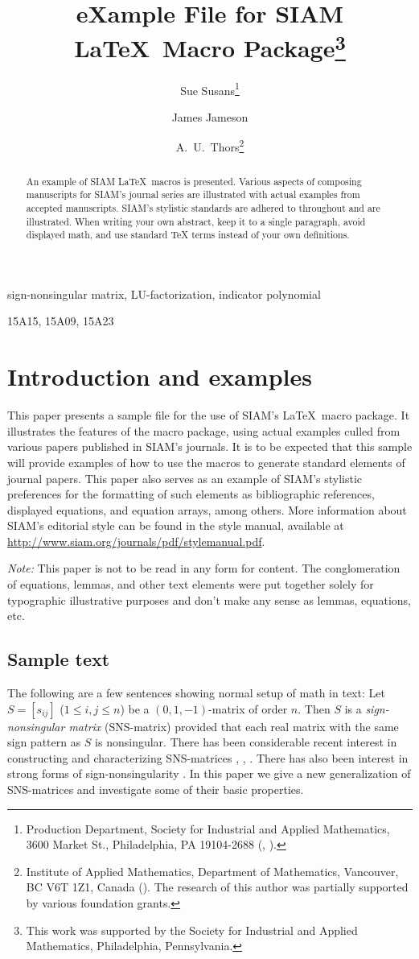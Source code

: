\documentclass[final,leqno,onetabnum]{siamltex0315}
\title{eXample File for SIAM \LaTeX\ Macro Package\thanks{This 
        work was supported by the Society for Industrial and
        Applied Mathematics, Philadelphia, Pennsylvania.}}
\author{Sue Susans\thanks{Production Department, Society
        for Industrial and Applied Mathematics, 3600 Market St., 
        Philadelphia, PA 
        19104-2688 (\email{pseudonym@siam.org}, \email{alias@siam.org}).}
   \and James Jameson\footnotemark[2]
   \and A.~U.~Thors\thanks{Institute of Applied Mathematics, Department of
        Mathematics, Vancouver, BC V6T 1Z1, Canada (\email{au.thors@math.ubc.ca}).
        The research of this author was partially supported by various foundation grants.}}
\begin{document}
\maketitle

\begin{abstract}
An example of SIAM \LaTeX\ macros is presented. Various
aspects of composing manuscripts for SIAM's journal series
are illustrated with actual examples from accepted
manuscripts. SIAM's stylistic standards are adhered to
throughout and are illustrated.  When writing your own abstract, keep it to a single paragraph, avoid 
displayed math, and use standard TeX terms instead of your own definitions. 
\end{abstract}

\begin{keywords} 
sign-nonsingular matrix, LU-factorization, indicator
polynomial 
\end{keywords}

\begin{AMS}
15A15, 15A09, 15A23
\end{AMS}

\pagestyle{myheadings}
\thispagestyle{plain}


\section{Introduction and examples}
This paper presents a sample file for the use of SIAM's
\LaTeX\ macro package. It illustrates the features of the
macro package, using actual examples culled from various
papers published in SIAM's journals. It is to be expected
that this sample will provide examples of how to use the
macros to generate standard elements of journal papers. This paper also
serves as an example of SIAM's stylistic preferences for
the formatting of such elements as bibliographic references,
displayed equations, and equation arrays, among others.  More information
about SIAM's editorial style can be found in the style manual, available
at \url{http://www.siam.org/journals/pdf/stylemanual.pdf}.

{\em Note:} This paper is not to be read in any form for content. 
The conglomeration of equations, lemmas, and other text elements were 
put together solely for typographic illustrative purposes and don't 
make any sense as lemmas, equations, etc.

\subsection{Sample text}
The following are a few sentences showing normal setup of math in text: Let $S=[s_{ij}]$ ($1\leq i,j\leq n$) be a $(0,1,-1)$-matrix
of order $n$. Then $S$ is a {\em sign-nonsingular matrix}
(SNS-matrix) provided that each real matrix with the same
sign pattern as $S$ is nonsingular. There has been
considerable recent interest in constructing and
characterizing SNS-matrices \cite{bs}, \cite{klm}, \cite{LiZeng2012a}. There
has also been interest in strong forms of
sign-nonsingularity \cite{djd}. In this paper we give a new
generalization of SNS-matrices and investigate some of
their basic properties.
\end{document}
